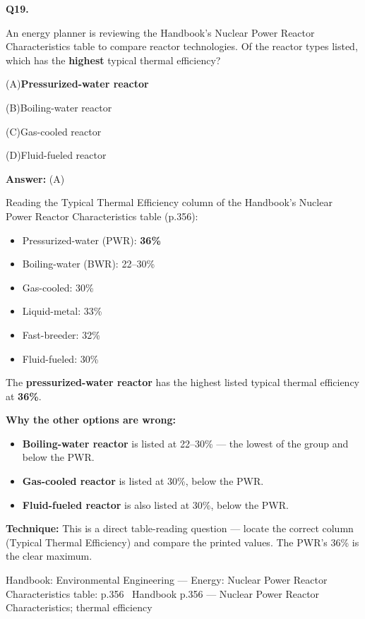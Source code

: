 \documentclass[11pt]{article}
\newcommand{\correct}[1]{\textbf{#1}\;{\color{accent}$\checkmark$}}
\newcommand{\optline}[2]{\par\noindent\hspace{1.2em}(#1)\hspace{0.6em}#2}
\begin{document}
\vspace{9pt}
\filbreak
\textbf{\color{accent}Q19.}\par\vspace{2pt}
An energy planner is reviewing the Handbook's Nuclear Power Reactor Characteristics table to compare reactor technologies. Of the reactor types listed, which has the \textbf{highest} typical thermal efficiency?\par\par\vspace{3pt}
\optline{A}{\correct{Pressurized-water reactor}}
\optline{B}{Boiling-water reactor}
\optline{C}{Gas-cooled reactor}
\optline{D}{Fluid-fueled reactor}
\par\vspace{3pt}
\vspace{2pt}\par\noindent\colorbox{boxbg}{\parbox{\dimexpr\linewidth-2\fboxsep\relax}{%
\vspace{2pt}\textbf{Answer:} (A)\par\vspace{2pt}
{\small Reading the Typical Thermal Efficiency column of the Handbook's Nuclear Power Reactor Characteristics table (p.356):\par
\begin{itemize}\setlength{\itemsep}{0pt}\setlength{\parskip}{0pt}
\item Pressurized-water (PWR): \textbf{36\%}
\item Boiling-water (BWR): 22--30\%
\item Gas-cooled: 30\%
\item Liquid-metal: 33\%
\item Fast-breeder: 32\%
\item Fluid-fueled: 30\%
\end{itemize}
The \textbf{pressurized-water reactor} has the highest listed typical thermal efficiency at \textbf{36\%}.\par
\textbf{Why the other options are wrong:}\par
\begin{itemize}\setlength{\itemsep}{0pt}\setlength{\parskip}{0pt}
\item \textbf{Boiling-water reactor} is listed at 22--30\% --- the lowest of the group and below the PWR.
\item \textbf{Gas-cooled reactor} is listed at 30\%, below the PWR.
\item \textbf{Fluid-fueled reactor} is also listed at 30\%, below the PWR.
\end{itemize}
\textbf{Technique:} This is a direct table-reading question --- locate the correct column (Typical Thermal Efficiency) and compare the printed values. The PWR's 36\% is the clear maximum.\par}\par\vspace{2pt}
{\footnotesize\color{soft}Handbook: Environmental Engineering --- Energy: Nuclear Power Reactor Characteristics table: p.356 \textbullet\ Handbook p.356 --- Nuclear Power Reactor Characteristics; thermal efficiency}\vspace{2pt}
}}
\end{document}

